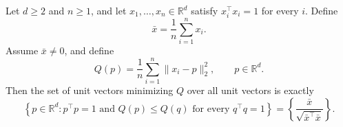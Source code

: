 \begin{theorem}
Let $d\ge2$ and $n\ge1$, and let $x_1,\ldots,x_n\in\mathbb R^d$ satisfy
$x_i^\top x_i=1$ for every $i$.  Define
\[
  \bar x=\frac1n\sum_{i=1}^n x_i.
\]
Assume $\bar x\ne0$, and define
\[
  Q(p)=\frac1n\sum_{i=1}^n\|x_i-p\|_2^2,
  \qquad p\in\mathbb R^d.
\]
Then the set of unit vectors minimizing $Q$ over all unit vectors is exactly
\[
 \left\{p\in\mathbb R^d:p^\top p=1
   \text{ and }Q(p)\le Q(q)\text{ for every }q^\top q=1\right\}
 =\left\{\frac{\bar x}{\sqrt{\bar x^\top\bar x}}\right\}.
\]
\end{theorem}
